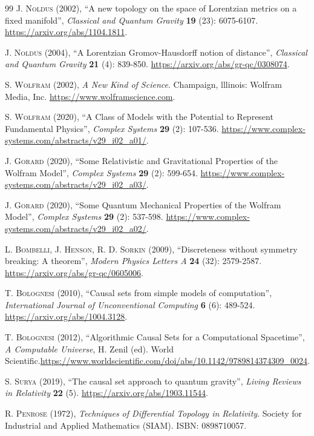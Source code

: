 \documentclass{article}
\begin{document}
\begin{thebibliography}{99}
\textsc{J. Noldus} (2002), ``A new topology on the space of Lorentzian metrics on a fixed manifold'', \textit{Classical and Quantum Gravity} \textbf{19} (23): 6075-6107. \url{https://arxiv.org/abs/1104.1811}.

\textsc{J. Noldus} (2004), ``A Lorentzian Gromov-Hausdorff notion of distance'', \textit{Classical and Quantum Gravity} \textbf{21} (4): 839-850. \url{https://arxiv.org/abs/gr-qc/0308074}.

\textsc{S. Wolfram} (2002), \textit{A New Kind of Science}. Champaign, lllinois: Wolfram Media, Inc. \url{https://www.wolframscience.com}.

\textsc{S. Wolfram} (2020), ``A Class of Models with the Potential to Represent Fundamental Physics'', \textit{Complex Systems} \textbf{29} (2): 107-536. \url{https://www.complex-systems.com/abstracts/v29_i02_a01/}.

\textsc{J. Gorard} (2020), ``Some Relativistic and Gravitational Properties of the Wolfram Model'', \textit{Complex Systems} \textbf{29} (2): 599-654. \url{https://www.complex-systems.com/abstracts/v29_i02_a03/}.

\textsc{J. Gorard} (2020), ``Some Quantum Mechanical Properties of the Wolfram Model'', \textit{Complex Systems} \textbf{29} (2): 537-598. \url{https://www.complex-systems.com/abstracts/v29_i02_a02/}.

\textsc{L. Bombelli, J. Henson, R. D. Sorkin} (2009), ``Discreteness without symmetry breaking: A theorem'', \textit{Modern Physics Letters A} \textbf{24} (32): 2579-2587. \url{https://arxiv.org/abs/gr-qc/0605006}.

\textsc{T. Bolognesi} (2010), ``Causal sets from simple models of computation'', \textit{International Journal of Unconventional Computing} \textbf{6} (6): 489-524. \url{https://arxiv.org/abs/1004.3128}.

\textsc{T. Bolognesi} (2012), ``Algorithmic Causal Sets for a Computational Spacetime'', \textit{A Computable Universe}, H. Zenil (ed). World Scientific.\url{https://www.worldscientific.com/doi/abs/10.1142/9789814374309_0024}.

\textsc{S. Surya} (2019), ``The causal set approach to quantum gravity'', \textit{Living Reviews in Relativity} \textbf{22} (5). \url{https://arxiv.org/abs/1903.11544}.

\textsc{R. Penrose} (1972), \textit{Techniques of Differential Topology in Relativity}. Society for Industrial and Applied Mathematics (SIAM). ISBN: 0898710057.


\end{thebibliography}
\end{document}
